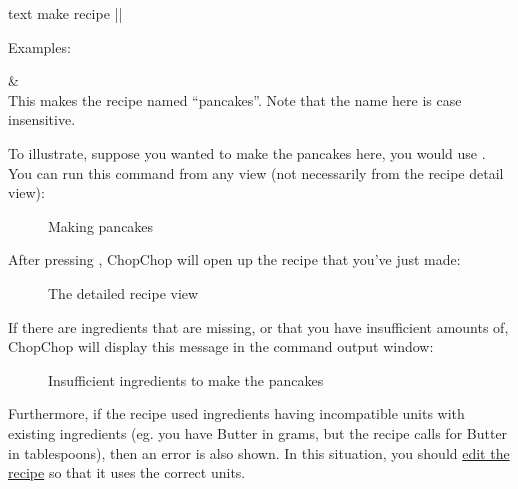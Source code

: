	 \begin{blockofcode}{text}
		make recipe |\itemref{}|
	\end{blockofcode}

	Examples:
	\begin{bulletlist}
		&  \\
		  This makes the recipe named \enquote{pancakes}. Note that the name here is case insensitive.
	\end{bulletlist}

	\pagebreak
	To illustrate, suppose you wanted to make the pancakes here, you would use . You can run this command from any view (not necessarily from the recipe detail view):
	\vspace{-1em} %
	\begin{figure}[!htbp]\centering\ContinuedFloat*
		\caption{Making pancakes}
	\end{figure}
	\vspace{-2em} %

	After pressing , ChopChop will open up the recipe that you've just made:
	\vspace{-.5em} %
	\begin{figure}[!htbp]\centering\ContinuedFloat
		\caption{The detailed recipe view}
	\end{figure}

	\pagebreak
	If there are ingredients that are missing, or that you have insufficient amounts of, ChopChop will display this message in the command output window:

	\begin{figure}[!htbp]\centering\ContinuedFloat
		\caption{Insufficient ingredients to make the pancakes}
	\end{figure}

	Furthermore, if the recipe used ingredients having incompatible units with existing ingredients (eg. you have Butter in grams,
	but the recipe calls for Butter in tablespoons), then an error is also shown. In this situation, you should
	\hyperlink{EditRecipeCommand}{edit the recipe} so that it uses the correct units.


